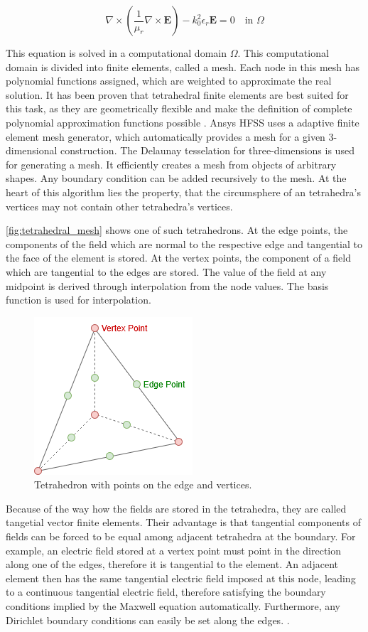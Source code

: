 \begin{equation}
    \nabla\times\left(\frac{1}{\mu_r}\nabla\times\mathbf{E}\right)-k_0^2\epsilon_r\mathbf{E}=0 \quad\text{in $\Omega$}
    \label{eqn:full_wave_equation}
\end{equation}

This equation is solved in a computational domain $\Omega$. This computational domain is divided into finite elements, called a mesh. Each node in this mesh has polynomial functions assigned, which are weighted to approximate the real solution. It has been proven that tetrahedral finite elements are best suited for this task, as they are geometrically flexible and make the definition of complete polynomial approximation functions possible \cite{Shenton_Cendes_1985}. Ansys HFSS uses a adaptive finite element mesh generator, which automatically provides a mesh for a given 3-dimensional construction. The Delaunay tesselation for three-dimensions is used for generating a mesh. It efficiently creates a mesh from objects of arbitrary shapes. Any boundary condition can be added recursively to the mesh. At the heart of this algorithm lies the property, that the circumsphere of an tetrahedra's vertices may not contain other tetrahedra's vertices. 

\autoref{fig:tetrahedral_mesh} shows one of such tetrahedrons. At the edge points, the components of the field which are normal to the respective edge and tangential to the face of the element is stored. At the vertex points, the component of a field which are tangential to the edges are stored. The value of the field at any midpoint is derived through interpolation from the node values. The basis function is used for interpolation.

\begin{figure}[h]
    \centering
    \includegraphics[width=0.25\linewidth]{content/10_theory/img/tetrahedral_mesh.png}
    \caption{Tetrahedron with points on the edge and vertices.}
    \label{fig:tetrahedral_mesh}
\end{figure}

Because of the way how the fields are stored in the tetrahedra, they are called tangetial vector finite elements. Their advantage is that tangential components of fields can be forced to be equal among adjacent tetrahedra at the boundary. For example, an electric field stored at a vertex point must point in the direction along one of the edges, therefore it is tangential to the element. An adjacent element then has the same tangential electric field imposed at this node, leading to a continuous tangential electric field, therefore satisfying the boundary conditions implied by the Maxwell equation automatically. Furthermore, any Dirichlet boundary conditions can easily be set along the edges.
\cite{85399}. 

